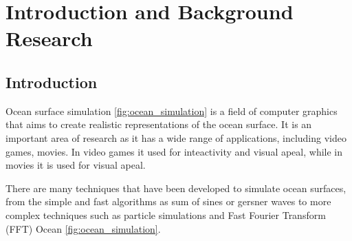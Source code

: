 \justifying
\chapter{Introduction and Background Research}



\label{chapter1}

\section{Introduction}


Ocean surface simulation \ref{fig:ocean_simulation} is a field of computer graphics that aims to create realistic representations of the ocean surface.
It is an important area of research as it has a wide range of applications, including video games, movies.
In video games it used for inteactivity and visual apeal, while in movies it is used for visual apeal. 

There are many techniques that have been developed to simulate ocean surfaces, from the simple and fast algorithms as 
sum of sines or gersner waves to more complex techniques such as particle simulations and Fast Fourier Transform (FFT) Ocean \ref{fig:ocean_simulation}.

